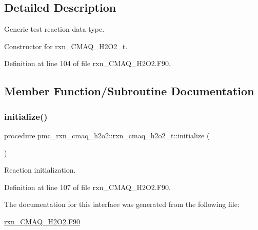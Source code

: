 \subsection{Detailed Description}
Generic test reaction data type. 

Constructor for rxn\+\_\+\+C\+M\+A\+Q\+\_\+\+H2\+O2\+\_\+t. 

Definition at line 104 of file rxn\+\_\+\+C\+M\+A\+Q\+\_\+\+H2\+O2.\+F90.



\subsection{Member Function/\+Subroutine Documentation}
\mbox{\label{structpmc__rxn__cmaq__h2o2_1_1rxn__cmaq__h2o2__t_ac766648dfe3890768a3f8f786d49eceb}} 
\subsubsection{\texorpdfstring{initialize()}{initialize()}}
{\footnotesize\ttfamily procedure pmc\+\_\+rxn\+\_\+cmaq\+\_\+h2o2\+::rxn\+\_\+cmaq\+\_\+h2o2\+\_\+t\+::initialize (\begin{DoxyParamCaption}{ }\end{DoxyParamCaption})\hspace{0.3cm}{\ttfamily [private]}}



Reaction initialization. 



Definition at line 107 of file rxn\+\_\+\+C\+M\+A\+Q\+\_\+\+H2\+O2.\+F90.



The documentation for this interface was generated from the following file\+:\begin{DoxyCompactItemize}
\item 
\mbox{\hyperlink{rxn___c_m_a_q___h2_o2_8_f90}{rxn\+\_\+\+C\+M\+A\+Q\+\_\+\+H2\+O2.\+F90}}\end{DoxyCompactItemize}
